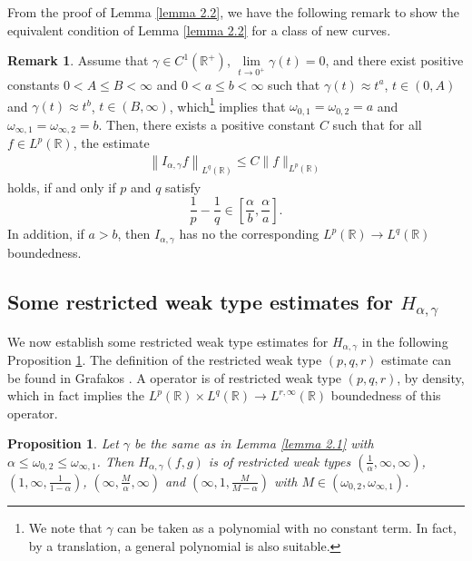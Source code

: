 \documentclass[11pt, twoside, leqno]{article}
\newtheorem{proposition}[theorem]{Proposition}
\theoremstyle{definition}
\newtheorem{remark}[theorem]{Remark}
\numberwithin{equation}{section}
\begin{document}
From the proof of Lemma \ref{lemma 2.2}, we have the following remark to show the equivalent condition of Lemma \ref{lemma 2.2} for a class of new curves.

\begin{remark}\label{remark 2.3}
Assume that $\gamma\in C^{1}(\mathbb{R}^+)$, $\lim\limits_{t\rightarrow 0^+}\gamma(t)=0$, and there exist positive constants $0<A\leq B<\infty$ and $0<a\leq b<\infty$ such that $\gamma(t)\approx t^{a}$, $t\in(0,A)$ and $\gamma(t)\approx t^{b}$, $t\in(B,\infty)$, which\footnote{We note that $\gamma$ can be taken as a polynomial with no constant term. In fact, by a translation, a general polynomial is also suitable.} implies that  $\omega_{0,1}=\omega_{0,2}=a$ and $\omega_{\infty,1}=\omega_{\infty,2}=b$. Then, there exists a positive constant $C$ such that for all $f\in L^{p}(\mathbb{R})$, the estimate
\begin{align*}
\left\|I_{\alpha,\gamma}f\right\|_{L^{q}(\mathbb{R})}\leq C\|f\|_{L^{p}(\mathbb{R})}
\end{align*}
holds, if and only if $p$ and $q$ satisfy
$${\frac{1}{p}}-{\frac{1}{q}}\in \left[{\frac{\alpha}{b}},{\frac{\alpha}{a}}\right].$$
In addition, if $a>b$, then $I_{\alpha,\gamma}$ has no the corresponding $L^{p}(\mathbb{R})\rightarrow L^{q}(\mathbb{R})$ boundedness.
\end{remark}


\subsection {Some restricted weak type estimates for $H_{\alpha,\gamma}$}

We now establish some restricted weak type estimates for $H_{\alpha,\gamma}$ in the following Proposition \ref{proposition 2.4}. The definition of the restricted weak type $(p,q,r)$ estimate can be found in Grafakos \cite{Graf}. A operator is of restricted weak type $(p,q,r)$, by density, which in fact implies the $L^p(\mathbb{R})\times L^q(\mathbb{R}) \rightarrow L^{r,\infty}(\mathbb{R})$ boundedness of this operator.

\begin{proposition}\label{proposition 2.4}
Let $\gamma $ be the same as in Lemma \ref{lemma 2.1} with $\alpha\leq\omega_{0,2}\leq  \omega_{\infty,1}$. Then $H_{\alpha,\gamma}(f,g)$  is of restricted weak types $({\frac{1}{\alpha}},\infty,\infty)$, $(1,\infty,{\frac{1}{1-\alpha}})$, $(\infty,{\frac{M}{\alpha}},\infty)$ and $(\infty,1,{\frac{M}{M-\alpha}})$ with $M\in (\omega_{0,2}, \omega_{\infty,1})$.
\end{proposition}
\end{document}
